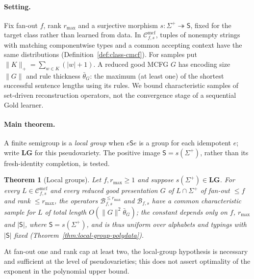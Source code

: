 \documentclass[11pt]{article}
\numberwithin{equation}{section}
\theoremstyle{plain}
\theoremstyle{definition}
\theoremstyle{remark}
\newcommand{\Cmcf}[2]{\mathcal{C}^{\mathrm{mcf}}_{#1,#2}}
\theoremstyle{plain}
\newtheorem{mainthm}{Theorem}
\begin{document}
\paragraph{Setting.}
Fix fan-out $f$, rank $r_{\max}$ and a surjective morphism
$s:\Sigma^+\twoheadrightarrow\mathsf S$, fixed for the target class
rather than learned from data. In $\Cmcf{f}{s}$, tuples of nonempty
strings with matching componentwise types and a common accepting context
have the same distributions (Definition~\ref{def:class-cmcf}).
For samples put $\|K\|_+=\sum_{w\in K}(|w|+1)$.
A reduced good MCFG $G$ has encoding size $\|G\|$ and rule thickness
$\bar\theta_G$: the maximum (at least one) of the shortest successful
sentence lengths using its rules. We bound characteristic samples of
set-driven reconstruction operators, not the convergence stage
of a sequential Gold learner.

\paragraph{Main theorem.}
A finite semigroup is a \emph{local group} when $e\mathsf Se$
is a group for each idempotent $e$; write $\mathbf{LG}$
for this pseudovariety. The positive image $\mathsf S=s(\Sigma^+)$,
rather than its fresh-identity completion, is tested.

\begin{mainthm}[Local groups]
\label{thm:A}
Let $f,r_{\max}\ge1$ and suppose $s(\Sigma^+)\in\mathbf{LG}$.  For every
$L\in\Cmcf{f}{s}$ and every reduced good presentation $G$ of $L\cap\Sigma^+$ of
fan-out $\le f$ and rank $\le r_{\max}$, the operators
$\mathcal B^{\le r_{\max}}_{f,s}$ and $\mathcal B_{f,s}$ have a common
characteristic sample for $L$ of total length $O(\|G\|^2\bar\theta_G)$; the
constant depends only on $f$, $r_{\max}$ and $|\mathsf S|$, where
$\mathsf S=s(\Sigma^+)$, and is thus uniform over alphabets and typings with
$|\mathsf S|$ fixed \textup(Theorem~\ref{thm:local-group-polydata}\textup).
\end{mainthm}

At fan-out one and rank cap at least two, the local-group hypothesis
is necessary and sufficient at the level of pseudovarieties; this does not
assert optimality of the exponent in the polynomial upper bound.
\end{document}
